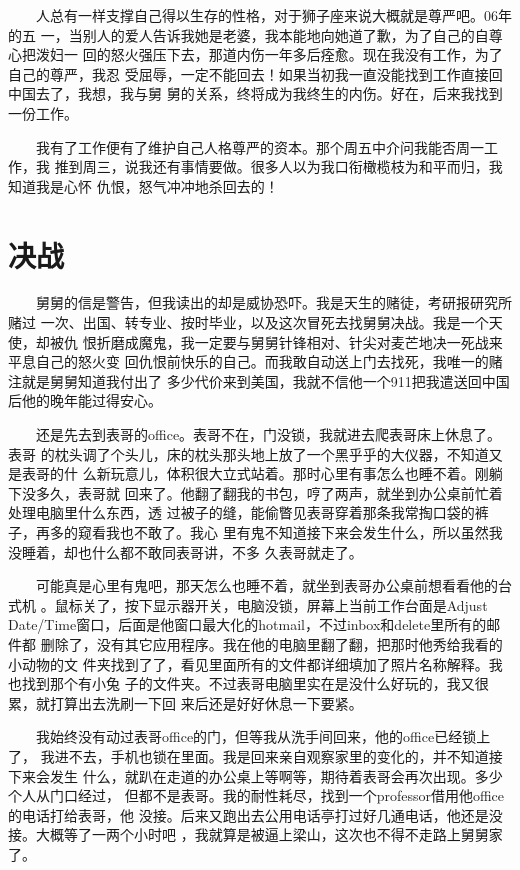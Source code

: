 \documentclass[12pt]{book}
\begin{document}
　　人总有一样支撑自己得以生存的性格，对于狮子座来说大概就是尊严吧。06年的五
一，当别人的爱人告诉我她是老婆，我本能地向她道了歉，为了自己的自尊心把泼妇一
回的怒火强压下去，那道内伤一年多后痊愈。现在我没有工作，为了自己的尊严，我忍
受屈辱，一定不能回去！如果当初我一直没能找到工作直接回中国去了，我想，我与舅
舅的关系，终将成为我终生的内伤。好在，后来我找到一份工作。

　　我有了工作便有了维护自己人格尊严的资本。那个周五中介问我能否周一工作，我
推到周三，说我还有事情要做。很多人以为我口衔橄榄枝为和平而归，我知道我是心怀
仇恨，怒气冲冲地杀回去的！
\section{决战}
\label{sec-8-30}

　　舅舅的信是警告，但我读出的却是威协恐吓。我是天生的赌徒，考研报研究所赌过
一次、出国、转专业、按时毕业，以及这次冒死去找舅舅决战。我是一个天使，却被仇
恨折磨成魔鬼，我一定要与舅舅针锋相对、针尖对麦芒地决一死战来平息自己的怒火变
回仇恨前快乐的自己。而我敢自动送上门去找死，我唯一的赌注就是舅舅知道我付出了
多少代价来到美国，我就不信他一个911把我遣送回中国后他的晚年能过得安心。

　　还是先去到表哥的office。表哥不在，门没锁，我就进去爬表哥床上休息了。表哥
的枕头调了个头儿，床的枕头那头地上放了一个黑乎乎的大仪器，不知道又是表哥的什
么新玩意儿，体积很大立式站着。那时心里有事怎么也睡不着。刚躺下没多久，表哥就
回来了。他翻了翻我的书包，哼了两声，就坐到办公桌前忙着处理电脑里什么东西，透
过被子的缝，能偷瞥见表哥穿着那条我常掏口袋的裤子，再多的窥看我也不敢了。我心
里有鬼不知道接下来会发生什么，所以虽然我没睡着，却也什么都不敢同表哥讲，不多
久表哥就走了。

　　可能真是心里有鬼吧，那天怎么也睡不着，就坐到表哥办公桌前想看看他的台式机
。鼠标关了，按下显示器开关，电脑没锁，屏幕上当前工作台面是Adjust 
Date/Time窗口，后面是他窗口最大化的hotmail，不过inbox和delete里所有的邮件都
删除了，没有其它应用程序。我在他的电脑里翻了翻，把那时他秀给我看的小动物的文
件夹找到了了，看见里面所有的文件都详细填加了照片名称解释。我也找到那个有小兔
子的文件夹。不过表哥电脑里实在是没什么好玩的，我又很累，就打算出去洗刷一下回
来后还是好好休息一下要紧。

　　我始终没有动过表哥office的门，但等我从洗手间回来，他的office已经锁上了，
我进不去，手机也锁在里面。我是回来亲自观察家里的变化的，并不知道接下来会发生
什么，就趴在走道的办公桌上等啊等，期待着表哥会再次出现。多少个人从门口经过，
但都不是表哥。我的耐性耗尽，找到一个professor借用他office的电话打给表哥，他
没接。后来又跑出去公用电话亭打过好几通电话，他还是没接。大概等了一两个小时吧
，我就算是被逼上梁山，这次也不得不走路上舅舅家了。
\end{document}
